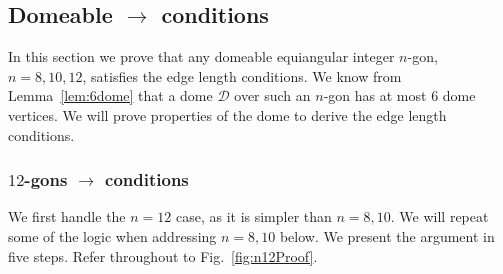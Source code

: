 \documentclass[11pt]{article}
\newcommand{\figref}[1]{\ref{fig:#1}}
\def\D{{\mathcal D}}
\newcommand{\JOR}[1]{{\color{red} JOR: [#1]}}
\newcommand{\Anna}[1]{{\color{red} Anna: [#1]}}
\begin{document}
\subsection{Domeable $\to$ conditions}

In this section we prove
that any domeable equiangular integer $n$-gon, $n=8,10,12$, satisfies the edge length conditions. We know from Lemma~\ref{lem:6dome} that
a dome $\D$ over such an $n$-gon has
at most 6 dome vertices. We will prove properties of 
the 
dome to derive the edge length conditions.



\subsubsection{$12$-gons $\to$ conditions}
We first handle the $n=12$ case, as it is simpler than $n=8,10$.
We will repeat some of the logic when addressing $n=8,10$ below.
We present the argument in five steps.  Refer throughout to Fig.~\figref{n12Proof}.
\end{document}
